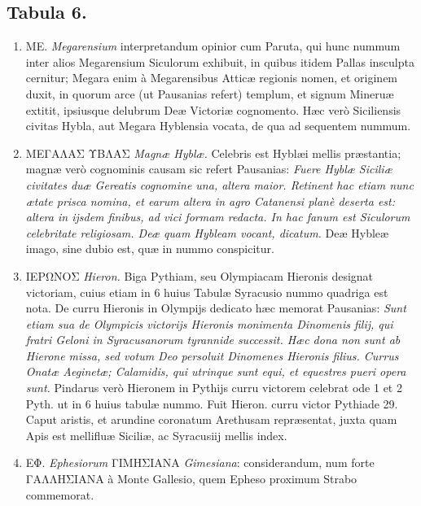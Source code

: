 \documentclass[a4paper, 11pt, oneside, polutonikogreek, latin]{article}
\begin{document}
\subsection*{Tabula 6.}
\begin{enumerate}
    \item \foreignlanguage{greek}{ΜΕ}. \emph{Megarensium} interpretandum opinior cum Paruta, qui hunc nummum inter alios Megarensium Siculorum exhibuit, in quibus itidem Pallas insculpta cernitur; Megara enim à Megarensibus Atticæ regionis nomen, et originem duxit, in quorum arce (ut Pausanias refert) templum, et signum Mineruæ extitit, ipsiusque delubrum Deæ Victoriæ cognomento. Hæc verò Siciliensis civitas Hybla, aut Megara Hyblensia vocata, de qua ad sequentem nummum.

    \item \foreignlanguage{greek}{ΜΕΓΑΛΑΣ ΥΒΛΑΣ} \emph{Magnæ Hyblæ.} Celebris est Hyblæi mellis præstantia; magnæ verò cognominis causam sic refert Pausanias: \emph{Fuere Hyblæ Siciliæ civitates duæ Gereatis cognomine una, altera maior. Retinent hac etiam nunc ætate prisca nomina, et earum altera in agro Catanensi planè deserta est: altera in ijsdem finibus, ad vici formam redacta. In hac fanum est Siculorum celebritate religiosam. Deæ quam Hybleam vocant, dicatum.} Deæ Hybleæ imago, sine dubio est, quæ in nummo conspicitur.

    \item \foreignlanguage{greek}{ΙΕΡΩΝΟΣ} \emph{Hieron.} Biga Pythiam, seu Olympiacam Hieronis designat victoriam, cuius etiam in 6 huius Tabulæ Syracusio nummo quadriga est nota. De curru Hieronis in Olympijs dedicato hæc memorat Pausanias: \emph{Sunt etiam sua de Olympicis victorijs Hieronis monimenta Dinomenis filij, qui fratri Geloni in Syracusanorum tyrannide successit. Hæc dona non sunt ab Hierone missa, sed votum Deo persoluit Dinomenes Hieronis filius. Currus Onatæ Aeginetæ; Calamidis, qui utrinque sunt equi, et equestres pueri opera sunt.} Pindarus verò Hieronem in Pythijs curru victorem celebrat ode 1 et 2 Pyth. ut in 6 huius tabulæ nummo. Fuit Hieron. curru victor Pythiade 29. Caput aristis, et arundine coronatum Arethusam repræsentat, juxta quam Apis est mellifluæ Siciliæ, ac Syracusiij mellis index.

    \item \foreignlanguage{greek}{ΕΦ}. \emph{Ephesiorum} \foreignlanguage{greek}{ΓΙΜΗΣΙΑΝΑ} \emph{Gimesiana}: considerandum, num forte\\ \foreignlanguage{greek}{ΓΑΛΛΗΣΙΑΝΑ} à Monte Gallesio, quem Epheso proximum Strabo commemorat.


\end{enumerate}
\end{document}
